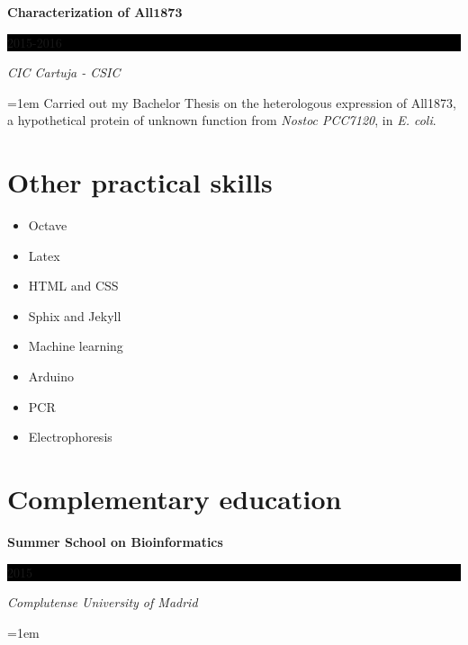 \documentclass[paper=a4,fontsize=11pt]{article} %
\newlength{\spacebox}
\newcommand{\NewPart}[1]{\section*{
									{#1}}}
\newcommand{\PersonalEntry}[2]{
		\noindent\hangindent=2em\hangafter=0 %
		\parbox{\spacebox}{        %
		\textit{#1}}		       %
		\hspace{1.5em} #2 \par}    %
\newcommand{\EducationEntry}[4]{
		\noindent \textbf{#1} \hfill      %
		\colorbox{Black}{%
			\parbox{6em}{%
			\hfill\color{White}#2}} \par  %
		\noindent \textit{#3} \par        %
		\noindent\hangindent=1em\hangafter=0 \small #4 %
		\normalsize \par}
\newcommand{\AwardEntry}[4]{
		\noindent \textbf{#1} \hfill      %
		\colorbox{Black}{%
			\parbox{3em}{%
			\hfill\color{White}#2}} \par  %
		\noindent \textit{#3} \par        %
		  \noindent\hangindent=1em\hangafter=0 \small #4  %
		\normalsize \par}
\newcommand{\VolunteeringEntry}[2]{      %
		\noindent\hangindent=2em\hangafter=0 %
		\parbox{\spacebox}{        %
		\textit{#1}}			   %
		\hspace{1.5em} #2 \par}    %
\begin{document}
\EducationEntry{Characterization of All\begin{math}\boldsymbol{1873}\end{math}}{2015-2016}{CIC Cartuja - CSIC}{Carried out my Bachelor Thesis on the heterologous expression of All1873, a hypothetical protein of unknown function from \textit{Nostoc PCC7120}, in \textit{E. coli}.}


\NewPart{Other practical skills}


\begin{multicols}{4}

\begin{itemize}
\item Octave
\item Latex

\end{itemize}

\columnbreak

\begin{itemize}
\item HTML and CSS
\item Sphix and Jekyll
\end{itemize}

\columnbreak

\begin{itemize}
\item Machine learning
\item Arduino
\end{itemize}

\columnbreak

\begin{itemize}
\item PCR
\item Electrophoresis
\end{itemize}
\end{multicols}




  
\NewPart{Complementary education}{}


\AwardEntry{Summer School on Bioinformatics}{2015}{Complutense University of Madrid}{}  
  
\end{document}
